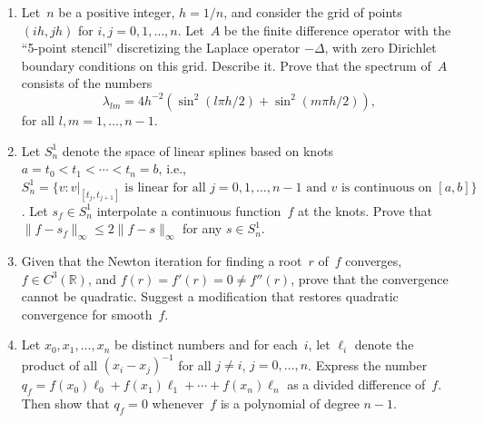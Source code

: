 \documentclass[11pt,letterpaper]{article}
\newenvironment{examproblems}[2]{%
  \def\ProblemHeadingTag{#2}%
  \AssignTaggingSocketPlug{block/list/label}{examproblem}%
  \begin{enumerate}%
  \setcounter{enumi}{#1}%
  \renewcommand{\labelenumi}{\textbf{\theenumi.}}%
  \setlength{\topsep}{0.35em}%
  \setlength{\partopsep}{0pt}%
  \setlength{\itemsep}{0.48em}%
  \setlength{\parsep}{0.18em}%
}{\end{enumerate}}
\begin{document}
\begin{examproblems}{0}{H2}
\[
\Phi(x)=\phi(\phi(x))+\frac{H(x)}{1-H(x)}\left(\phi(\phi(x))-\phi(x)\right)
\]

\[
H(x)=\frac{\phi(\phi(x))-\phi(x)}{\phi(x)-x}.
\]
 Show that the iteration \(x_{n+1}=\Phi(x_n)\) is quadratically convergent to~\(\alpha\) when the starting guess \(x_0\) is sufficiently close to~\(\alpha\).
\def\ProblemHeadingText{Problem 7.}
\item
Let~\(n\) be a positive integer, \(h=1/n\), and consider the grid of points \((ih,jh)\) for \(i,j=0,1,\ldots,n\). Let~\(A\) be the finite difference operator with the “5-point stencil” discretizing the Laplace operator \(-\Delta\), with zero Dirichlet boundary conditions on this grid. Describe it. Prove that the spectrum of~\(A\) consists of the numbers
\[
\lambda_{lm}=4h^{-2}\left(\sin^2(l\pi h/2)+\sin^2(m\pi h/2)\right),
\]
 for all \(l,m=1,\ldots,n-1\).
\def\ProblemHeadingText{Problem 8.}
\item
Let \(S_n^1\) denote the space of linear splines based on knots \(a=t_0<t_1<\cdots<t_n=b\), i.e., \(S_n^1=\{v:v|_{[t_j,t_{j+1}]}\text{ is linear for all }j=0,1,\ldots,n-1\text{ and }v\text{ is continuous on }[a,b]\}\). Let \(s_f\in S_n^1\) interpolate a continuous function~\(f\) at the knots. Prove that \(\|f-s_f\|_\infty\leq2\|f-s\|_\infty\) for any \(s\in S_n^1\).
\def\ProblemHeadingText{Problem 9.}
\item
Given that the Newton iteration for finding a root~\(r\) of~\(f\) converges, \(f\in C^3(\mathbb{R})\), and \(f(r)=f'(r)=0\neq f''(r)\), prove that the convergence cannot be quadratic. Suggest a modification that restores quadratic convergence for smooth~\(f\).
\def\ProblemHeadingText{Problem 10.}
\item
Let \(x_0,x_1,\ldots,x_n\) be distinct numbers and for each~\(i\), let \(\ell_i\) denote the product of all \((x_i-x_j)^{-1}\) for all \(j\neq i\), \(j=0,\ldots,n\). Express the number \(q_f=f(x_0)\ell_0+f(x_1)\ell_1+\cdots+f(x_n)\ell_n\) as a divided difference of~\(f\). Then show that \(q_f=0\) whenever~\(f\) is a polynomial of degree \(n-1\).
\end{examproblems}
\end{document}
